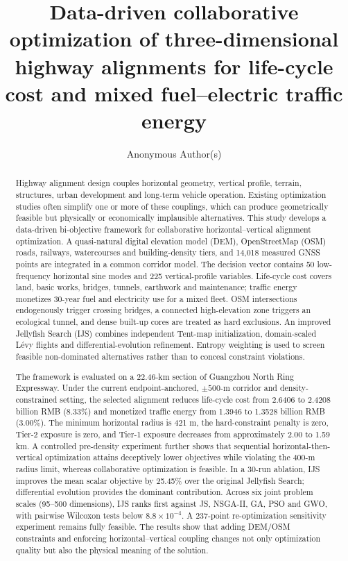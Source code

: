 \documentclass[preprint,12pt]{elsarticle}
\begin{document}
\begin{frontmatter}

\title{Data-driven collaborative optimization of three-dimensional highway alignments for life-cycle cost and mixed fuel--electric traffic energy}

\author[aff1]{Anonymous Author(s)}

\begin{abstract}
Highway alignment design couples horizontal geometry, vertical profile, terrain, structures, urban development and long-term vehicle operation. Existing optimization studies often simplify one or more of these couplings, which can produce geometrically feasible but physically or economically implausible alternatives. This study develops a data-driven bi-objective framework for collaborative horizontal--vertical alignment optimization. A quasi-natural digital elevation model (DEM), OpenStreetMap (OSM) roads, railways, watercourses and building-density tiers, and 14,018 measured GNSS points are integrated in a common corridor model. The decision vector contains 50 low-frequency horizontal sine modes and 225 vertical-profile variables. Life-cycle cost covers land, basic works, bridges, tunnels, earthwork and maintenance; traffic energy monetizes 30-year fuel and electricity use for a mixed fleet. OSM intersections endogenously trigger crossing bridges, a connected high-elevation zone triggers an ecological tunnel, and dense built-up cores are treated as hard exclusions. An improved Jellyfish Search (IJS) combines independent Tent-map initialization, domain-scaled L\'evy flights and differential-evolution refinement. Entropy weighting is used to screen feasible non-dominated alternatives rather than to conceal constraint violations.

The framework is evaluated on a 22.46-km section of Guangzhou North Ring Expressway. Under the current endpoint-anchored, $\pm500$-m corridor and density-constrained setting, the selected alignment reduces life-cycle cost from 2.6406 to 2.4208 billion RMB (8.33\%) and monetized traffic energy from 1.3946 to 1.3528 billion RMB (3.00\%). The minimum horizontal radius is 421 m, the hard-constraint penalty is zero, Tier-2 exposure is zero, and Tier-1 exposure decreases from approximately 2.00 to 1.59 km. A controlled pre-density experiment further shows that sequential horizontal-then-vertical optimization attains deceptively lower objectives while violating the 400-m radius limit, whereas collaborative optimization is feasible. In a 30-run ablation, IJS improves the mean scalar objective by 25.45\% over the original Jellyfish Search; differential evolution provides the dominant contribution. Across six joint problem scales (95--500 dimensions), IJS ranks first against JS, NSGA-II, GA, PSO and GWO, with pairwise Wilcoxon tests below $8.8\times10^{-4}$. A 237-point re-optimization sensitivity experiment remains fully feasible. The results show that adding DEM/OSM constraints and enforcing horizontal--vertical coupling changes not only optimization quality but also the physical meaning of the solution.
\end{abstract}


\end{frontmatter}
\end{document}
